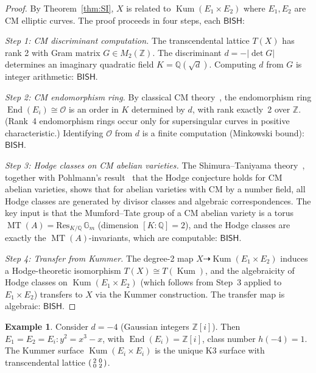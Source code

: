 \documentclass[11pt,a4paper]{article}
\theoremstyle{plain}
\theoremstyle{definition}
\newtheorem{example}[theorem]{Example}
\newcommand{\BISH}{\textsf{BISH}}
\newcommand{\Z}{\mathbb{Z}}
\newcommand{\Q}{\mathbb{Q}}
\DeclareMathOperator{\End}{End}
\DeclareMathOperator{\MT}{MT}
\DeclareMathOperator{\Kum}{Kum}
\begin{document}
\begin{proof}
By Theorem~\ref{thm:SI}, $X$ is related to $\Kum(E_1 \times E_2)$ where $E_1, E_2$ are CM elliptic curves. The proof proceeds in four steps, each $\BISH$:

\emph{Step 1: CM discriminant computation.} The transcendental lattice $T(X)$ has rank 2 with Gram matrix $G \in M_2(\Z)$. The discriminant $d = -|\det G|$ determines an imaginary quadratic field $K = \Q(\sqrt{d})$. Computing $d$ from $G$ is integer arithmetic: $\BISH$.

\emph{Step 2: CM endomorphism ring.} By classical CM theory~\cite{shimura-taniyama}, the endomorphism ring $\End(E_i) \cong \mathcal{O}$ is an order in $K$ determined by $d$, with rank exactly~2 over $\Z$. (Rank~4 endomorphism rings occur only for supersingular curves in positive characteristic.) Identifying $\mathcal{O}$ from $d$ is a finite computation (Minkowski bound): $\BISH$.

\emph{Step 3: Hodge classes on CM abelian varieties.} The Shimura--Taniyama theory~\cite{shimura-taniyama}, together with Pohlmann's result~\cite{pohlmann} that the Hodge conjecture holds for CM abelian varieties, shows that for abelian varieties with CM by a number field, all Hodge classes are generated by divisor classes and algebraic correspondences. The key input is that the Mumford--Tate group of a CM abelian variety is a torus $\MT(A) = \mathrm{Res}_{K/\Q}\, \mathbb{G}_m$ (dimension $[K:\Q] = 2$), and the Hodge classes are exactly the $\MT(A)$-invariants, which are computable: $\BISH$.

\emph{Step 4: Transfer from Kummer.} The degree-2 map $X \dashrightarrow \Kum(E_1 \times E_2)$ induces a Hodge-theoretic isomorphism $T(X) \cong T(\Kum)$, and the algebraicity of Hodge classes on $\Kum(E_1 \times E_2)$ (which follows from Step~3 applied to $E_1 \times E_2$) transfers to $X$ via the Kummer construction. The transfer map is algebraic: $\BISH$.
\end{proof}

\begin{example}
Consider $d = -4$ (Gaussian integers $\Z[i]$). Then $E_1 = E_2 = E_i : y^2 = x^3 - x$, with $\End(E_i) = \Z[i]$, class number $h(-4) = 1$. The Kummer surface $\Kum(E_i \times E_i)$ is the unique K3 surface with transcendental lattice $\begin{psmallmatrix} 2 & 0 \\ 0 & 2 \end{psmallmatrix}$.
\end{example}
\end{document}
